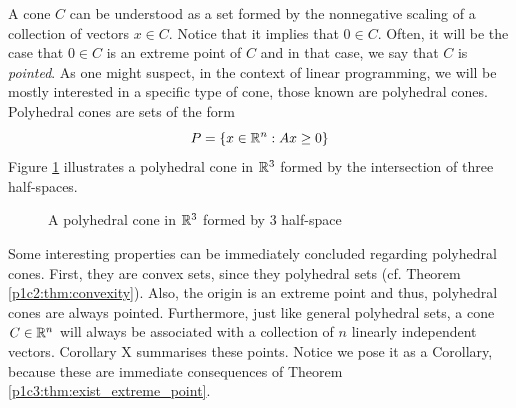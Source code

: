 A cone $C$ can be understood as a set formed by the nonnegative scaling  of a collection of vectors $x \in C$. Notice that it implies that $ 0 \in C$. Often, it will be the case that $ 0 \in C$ is an extreme point of $C$ and in that case, we say that $C$ is \emph{pointed}. As one might suspect, in the context of linear programming, we will be mostly interested in a specific type of cone, those known are polyhedral cones. Polyhedral cones are sets of the form 
%
\begin{equation*}
	P = \left\{ x \in \mathbb{R}^n : Ax \geq 0 \right \}
\end{equation*}
%
Figure \ref{p1c6:fig:poly_cone} illustrates a polyhedral cone in $\mathbb{R}^3$ formed by the intersection of three half-spaces. 
%
\begin{figure}
	\caption{A polyhedral cone in $\mathbb{R}^3$ formed by 3 half-space} \label{p1c6:fig:poly_cone}
\end{figure}
%

Some interesting properties can be immediately concluded regarding polyhedral cones. First, they are convex sets, since they polyhedral sets (cf. Theorem \ref{p1c2:thm:convexity}). Also, the origin is an extreme point and thus, polyhedral cones are always pointed. Furthermore, just like general polyhedral sets, a cone $C \in \mathbb{R}^n$ will always be associated with a collection of $n$ linearly independent vectors. Corollary X summarises these points. Notice we pose it as a Corollary, because these are immediate consequences of Theorem \ref{p1c3:thm:exist_extreme_point}.


